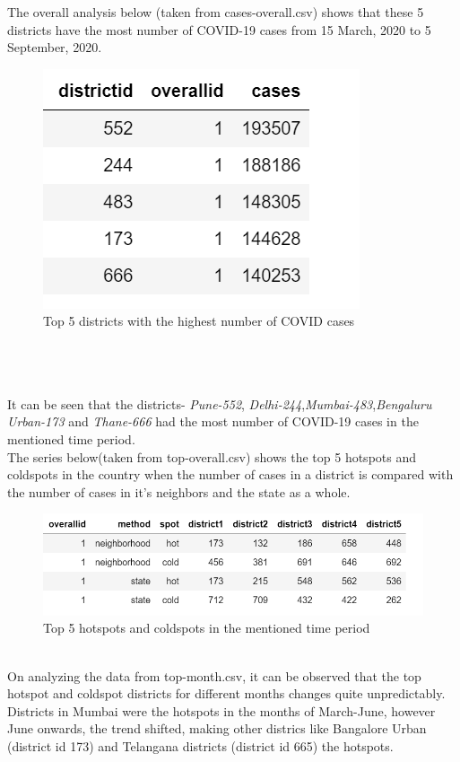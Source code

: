 \documentclass{article}
\begin{document}
The overall analysis below (taken from cases-overall.csv) shows that these 5 districts have the most number of COVID-19 cases from 15 March, 2020 to 5 September, 2020.
\begin{figure}[h]
\centerline{\includegraphics{overallcases.png}}
\caption{Top 5 districts with the highest number of COVID cases}
\label{fig}
\end{figure} \\
\\
\\
It can be seen that the districts- \textit{Pune-552}, \textit{Delhi-244},\textit{Mumbai-483},\textit{Bengaluru Urban-173} and \textit{Thane-666} had the most number of COVID-19 cases in the mentioned time period. \\
The series below(taken from top-overall.csv) shows the top 5 hotspots and coldspots in the country when the number of cases in a district is compared with the number of cases in it's neighbors and the state as a whole. \\
\begin{figure}[h]
\centerline{\includegraphics{hotspotsoverall.png}}
\caption{Top 5 hotspots and coldspots in the mentioned time period}
\label{fig}
\end{figure} \\
On analyzing the data from top-month.csv, it can be observed that the top hotspot and coldspot districts for different months changes quite unpredictably. Districts in Mumbai were the hotspots in the months of March-June, however June onwards, the trend shifted, making other districs like Bangalore Urban (district id 173) and Telangana districts (district id 665) the hotspots. 
\end{document}
